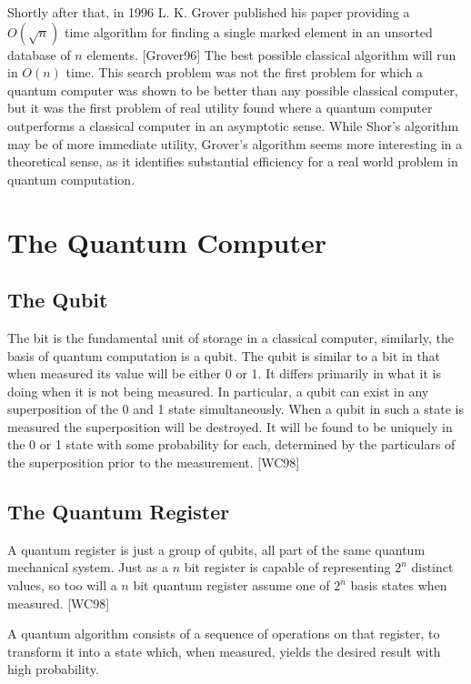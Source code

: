 \documentclass[]{article}
\begin{document}
Shortly after that, in 1996 L. K. Grover published his paper providing
a $O(\sqrt{n})$ time algorithm for finding a single marked element in
an unsorted database of $n$ elements.  [Grover96] The best possible
classical algorithm will run in $O(n)$ time.  This search problem was
not the first problem for which a quantum computer was shown to be
better than any possible classical computer, but it was the first
problem of real utility found where a quantum computer outperforms a
classical computer in an asymptotic sense. While Shor's algorithm may
be of more immediate utility, Grover's algorithm seems more
interesting in a theoretical sense, as it identifies substantial
efficiency for a real world problem in quantum computation.

\section{The Quantum Computer}

\subsection{The Qubit}

The bit is the fundamental unit of storage in a classical computer,
similarly, the basis of quantum computation is a qubit.  The qubit is
similar to a bit in that when measured its value will be either 0 or
1.  It differs primarily in what it is doing when it is not being
measured.  In particular, a qubit can exist in any superposition of
the 0 and 1 state simultaneously.  When a qubit in such a state is
measured the superposition will be destroyed.  It will be found to be
uniquely in the 0 or 1 state with some probability for each,
determined by the particulars of the superposition prior to the
measurement. [WC98]

\subsection{The Quantum Register}

A quantum register is just a group of qubits, all part of the same
quantum mechanical system.  Just as a $n$ bit register is capable of
representing $2^{n}$ distinct values, so too will a $n$ bit quantum
register assume one of $2^{n}$ basis states when measured. [WC98]

A quantum algorithm consists of a sequence of operations on that
register, to transform it into a state which, when measured, yields
the desired result with high probability.
	
\end{document}
